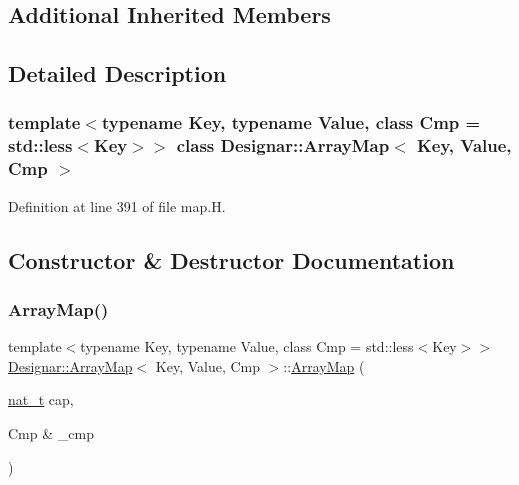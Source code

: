\subsection*{Additional Inherited Members}


\subsection{Detailed Description}
\subsubsection*{template$<$typename Key, typename Value, class Cmp = std\+::less$<$\+Key$>$$>$\newline
class Designar\+::\+Array\+Map$<$ Key, Value, Cmp $>$}



Definition at line 391 of file map.\+H.



\subsection{Constructor \& Destructor Documentation}
\mbox{\label{class_designar_1_1_array_map_aa08404c6d0b6d40d7aefd04ccea24bc5}} 
\subsubsection{\texorpdfstring{Array\+Map()}{ArrayMap()}\hspace{0.1cm}{\footnotesize\ttfamily [1/6]}}
{\footnotesize\ttfamily template$<$typename Key, typename Value, class Cmp = std\+::less$<$\+Key$>$$>$ \\
\hyperlink{class_designar_1_1_array_map}{Designar\+::\+Array\+Map}$<$ Key, Value, Cmp $>$\+::\hyperlink{class_designar_1_1_array_map}{Array\+Map} (\begin{DoxyParamCaption}\item[{\hyperlink{namespace_designar_aa72662848b9f4815e7bf31a7cf3e33d1}{nat\+\_\+t}}]{cap,  }\item[{Cmp \&}]{\+\_\+cmp }\end{DoxyParamCaption})\hspace{0.3cm}{\ttfamily [inline]}}



